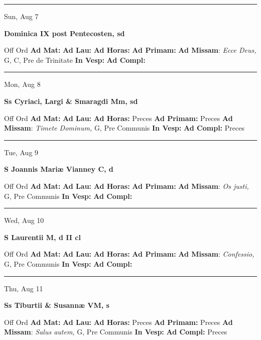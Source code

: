 \documentclass[letterpaper, 10pt]{article}
\begin{document}
\hrule
\begin{center}
Sun, Aug 7
\end{center}\textbf{ \large Dominica IX post Pentecosten, \textnormal{\normalsize sd}}
\begin{justify}
Off Ord
\textbf{Ad Mat: }
\textbf{Ad Lau: }
\textbf{Ad Horas: }
\textbf{Ad Primam: }
\textbf{Ad Missam}: \textit{Ecce Deus,} G, C, Pre de Trinitate
\textbf{In Vesp: }
\textbf{Ad Compl: }\end{justify}



\hrule
\begin{center}
Mon, Aug 8
\end{center}\textbf{ \large Ss Cyriaci, Largi \& Smaragdi Mm, \textnormal{\normalsize sd}}
\begin{justify}
Off Ord
\textbf{Ad Mat: }
\textbf{Ad Lau: }
\textbf{Ad Horas: }Preces
\textbf{Ad Primam: }Preces
\textbf{Ad Missam}: \textit{Timete Dominum,} G, Pre Communis
\textbf{In Vesp: }
\textbf{Ad Compl: }Preces\end{justify}



\hrule
\begin{center}
Tue, Aug 9
\end{center}\textbf{ \large S Joannis Mariæ Vianney C, \textnormal{\normalsize d}}
\begin{justify}
Off Ord
\textbf{Ad Mat: }
\textbf{Ad Lau: }
\textbf{Ad Horas: }
\textbf{Ad Primam: }
\textbf{Ad Missam}: \textit{Os justi,} G, Pre Communis
\textbf{In Vesp: }
\textbf{Ad Compl: }\end{justify}



\hrule
\begin{center}
Wed, Aug 10
\end{center}\textbf{ \large S Laurentii M, \textnormal{\normalsize d II cl}}
\begin{justify}
Off Ord
\textbf{Ad Mat: }
\textbf{Ad Lau: }
\textbf{Ad Horas: }
\textbf{Ad Primam: }
\textbf{Ad Missam}: \textit{Confessio,} G, Pre Communis
\textbf{In Vesp: }
\textbf{Ad Compl: }\end{justify}



\hrule
\begin{center}
Thu, Aug 11
\end{center}\textbf{ \large Ss Tiburtii \& Susannæ VM, \textnormal{\normalsize s}}
\begin{justify}
Off Ord
\textbf{Ad Mat: }
\textbf{Ad Lau: }
\textbf{Ad Horas: }Preces
\textbf{Ad Primam: }Preces
\textbf{Ad Missam}: \textit{Salus autem,} G, Pre Communis
\textbf{In Vesp: }
\textbf{Ad Compl: }Preces\end{justify}
\end{document}
